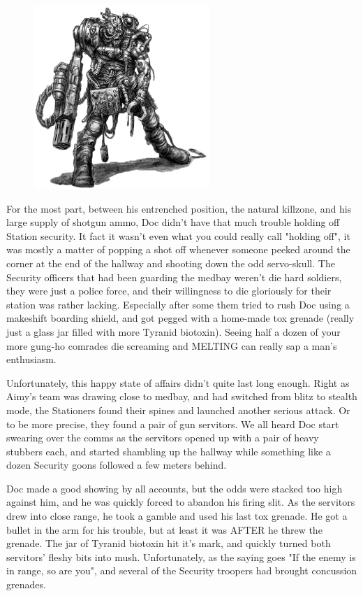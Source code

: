 \begin{figure}
	\begin{center}
		\includegraphics[width=\figwidth]{pics/14/35.png}
	\end{center}
\end{figure}
For the most part, between his entrenched position, the natural killzone, and his large supply of shotgun ammo, Doc didn't have that much trouble holding off Station security. 
It fact it wasn't even what you could really call "holding off", it was mostly a matter of popping a shot off whenever someone peeked around the corner at the end of the hallway and shooting down the odd servo-skull. 
The Security officers that had been guarding the medbay weren't die hard soldiers, they were just a police force, and their willingness to die gloriously for their station was rather lacking. 
Especially after some them tried to rush Doc using a makeshift boarding shield, and got pegged with a home-made tox grenade (really just a glass jar filled with more Tyranid biotoxin). 
Seeing half a dozen of your more gung-ho comrades die screaming and MELTING can really sap a man's enthusiasm.

Unfortunately, this happy state of affairs didn't quite last long enough. 
Right as Aimy's team was drawing close to medbay, and had switched from blitz to stealth mode, the Stationers found their spines and launched another serious attack. 
Or to be more precise, they found a pair of gun servitors. 
We all heard Doc start swearing over the comms as the servitors opened up with a pair of heavy stubbers each, and started shambling up the hallway while something like a dozen Security goons followed a few meters behind.

Doc made a good showing by all accounts, but the odds were stacked too high against him, and he was quickly forced to abandon his firing slit. 
As the servitors drew into close range, he took a gamble and used his last tox grenade. 
He got a bullet in the arm for his trouble, but at least it was AFTER he threw the grenade. 
The jar of Tyranid biotoxin hit it's mark, and quickly turned both servitors' fleshy bits into mush. 
Unfortunately, as the saying goes "If the enemy is in range, so are you", and several of the Security troopers had brought concussion grenades. 


